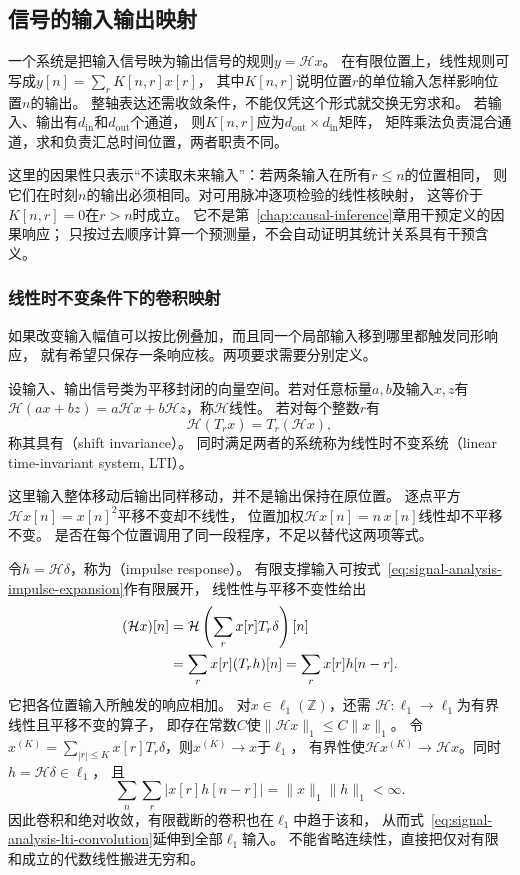 \subsection{信号的输入输出映射}
\label{sec:signal-input-output-maps}
\label{sec:signal-analysis-discrete-filtering}

一个系统是把输入信号映为输出信号的规则$y=\mathcal Hx$。
在有限位置上，线性规则可写成$y[n]=\sum_r K[n,r]x[r]$，
其中$K[n,r]$说明位置$r$的单位输入怎样影响位置$n$的输出。
整轴表达还需收敛条件，不能仅凭这个形式就交换无穷求和。
若输入、输出有$d_{\mathrm{in}}$和$d_{\mathrm{out}}$个通道，
则$K[n,r]$应为$d_{\mathrm{out}}\times d_{\mathrm{in}}$矩阵，
矩阵乘法负责混合通道，求和负责汇总时间位置，两者职责不同。

这里的因果性只表示“不读取未来输入”：若两条输入在所有$r\leq n$的位置相同，
则它们在时刻$n$的输出必须相同。对可用脉冲逐项检验的线性核映射，
这等价于$K[n,r]=0$在$r>n$时成立。
它不是第~\ref{chap:causal-inference}章用干预定义的因果响应；
只按过去顺序计算一个预测量，不会自动证明其统计关系具有干预含义。

\subsubsection{线性时不变条件下的卷积映射}
\label{sec:signal-analysis-lti-convolution}

如果改变输入幅值可以按比例叠加，而且同一个局部输入移到哪里都触发同形响应，
就有希望只保存一条响应核。两项要求需要分别定义。
\begin{definition}[线性时不变系统]
  \label{def:signal-analysis-lti-system}
  设输入、输出信号类为平移封闭的向量空间。若对任意标量$a,b$及输入$x,z$有
  $\mathcal H(ax+bz)=a\mathcal Hx+b\mathcal Hz$，称$\mathcal H$线性。
  若对每个整数$r$有
  \[
    \mathcal H(T_rx)=T_r(\mathcal Hx),
  \]
  称其具有（shift invariance）。
  同时满足两者的系统称为线性时不变系统（linear time-invariant system, LTI）。
\end{definition}
这里输入整体移动后输出同样移动，并不是输出保持在原位置。
逐点平方$\mathcal Hx[n]=x[n]^2$平移不变却不线性，
位置加权$\mathcal Hx[n]=n\,x[n]$线性却不平移不变。
是否在每个位置调用了同一段程序，不足以替代这两项等式。

令$h=\mathcal H\delta$，称为（impulse response）。
有限支撑输入可按式~\eqref{eq:signal-analysis-impulse-expansion}作有限展开，
线性性与平移不变性给出
\begin{align}
  (\mathcal Hx)[n]
  &=\mathcal H\left(\sum_r x[r]T_r\delta\right)[n]\notag\\
  &=\sum_r x[r](T_rh)[n]=\sum_r x[r]h[n-r].
  \label{eq:signal-analysis-lti-convolution}
\end{align}
它把各位置输入所触发的响应相加。
对$x\in\ell_1(\mathbb Z)$，还需
$\mathcal H:\ell_1\to\ell_1$为有界线性且平移不变的算子，
即存在常数$C$使$\|\mathcal Hx\|_1\leq C\|x\|_1$。
令$x^{(K)}=\sum_{|r|\leq K}x[r]T_r\delta$，则$x^{(K)}\to x$于$\ell_1$，
有界性使$\mathcal Hx^{(K)}\to\mathcal Hx$。同时$h=\mathcal H\delta\in\ell_1$，
且
\[
  \sum_n\sum_r|x[r]h[n-r]|=\|x\|_1\|h\|_1<\infty.
\]
因此卷积和绝对收敛，有限截断的卷积也在$\ell_1$中趋于该和，
从而式~\eqref{eq:signal-analysis-lti-convolution}延伸到全部$\ell_1$输入。
不能省略连续性，直接把仅对有限和成立的代数线性搬进无穷和。


